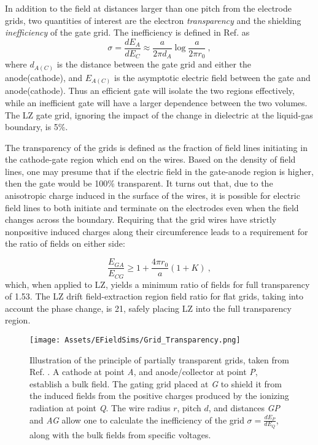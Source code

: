 In addition to the field at distances larger than one pitch from the electrode grids, two quantities of interest are the electron \textit{transparency} and the shielding \textit{inefficiency} of the gate grid.
The inefficiency is defined in Ref. \cite{bunemann_design_1949} as \begin{equation}
    \sigma = \frac{dE_{A}}{dE_{C}} \approx \frac{a}{2 \pi d_{A}}\log \frac{a}{2 \pi r_0}~,
\end{equation}
\noindent
where $d_{A(C)}$ is the distance between the gate grid and either the anode(cathode), and $E_{A(C)}$ is the asymptotic electric field between the gate and anode(cathode).
Thus an efficient gate will isolate the two regions effectively, while an inefficient gate will have a larger dependence between the two volumes.
The LZ gate grid, ignoring the impact of the change in dielectric at the liquid-gas boundary, is 5\%.

The transparency of the grids is defined as the fraction of field lines initiating in the cathode-gate region which end on the wires.
Based on the density of field lines, one may presume that if the electric field in the gate-anode region is higher, then the gate would be 100\% transparent.
It turns out that, due to the anisotropic charge induced in the surface of the wires, it is possible for electric field lines to both initiate and terminate on the electrodes even when the field changes across the boundary.
Requiring that the grid wires have strictly nonpositive induced charges along their circumference leads to a requirement for the ratio of fields on either side\cite{mcdonald_kirk_pdf_nodate}:

\begin{equation}
    \frac{E_{GA}}{E_{CG}} \geq 1 + \frac{4 \pi r_0}{a}(1+K)~,
\end{equation}
\noindent
which, when applied to LZ, yields a minimum ratio of fields for full transparency of 1.53.
The LZ drift field-extraction region field ratio for flat grids, taking into account the phase change, is 21, safely placing LZ into the full transparency region.

\begin{figure}
    \centering
    \texttt{[image: Assets/EFieldSims/Grid\_Transparency.png]}
    \caption[Illustration of the principle of partially transparent grids, taken from Ref. \cite{bunemann_design_1949}.]%
    {Illustration of the principle of partially transparent grids, taken from Ref. \cite{bunemann_design_1949}.
    A cathode at point \textit{A}, and anode/collector at point \textit{P}, establish a bulk field.
    The gating grid placed at \textit{G} to shield it from the induced fields from the positive charges produced by the ionizing radiation at point \textit{Q}.
    The wire radius $r$, pitch $d$, and  distances \textit{GP} and \textit{AG} allow one to calculate the inefficiency of the grid $\sigma = \frac{dE_P}{dE_Q}$, along with the bulk fields from specific voltages.}
    \label{fig:grid_transparency}
\end{figure}

